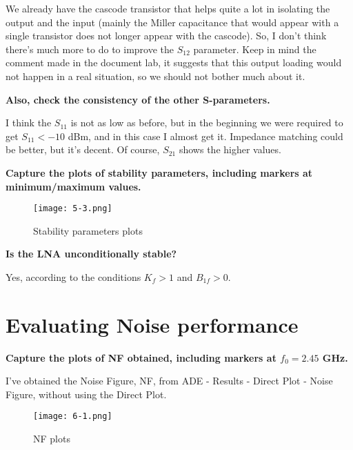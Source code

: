    \noindent We already have the cascode transistor that helps quite a lot in isolating the output and the input (mainly the Miller capacitance that would appear with a single transistor does not longer appear with the cascode). So, I don't think there's much more to do to improve the $S_{12}$ parameter. Keep in mind the comment made in the document lab, it suggests that this output loading would not happen in a real situation, so we should not bother much about it.




\begin{pexbox}{}
   \noindent \textbf{Also, check the consistency of the other S-parameters.}
\end{pexbox}

   \noindent I think the $S_{11}$ is not as low as before, but in the beginning we were required to get $S_{11}<-10$ dBm, and in this case I almost get it. Impedance matching could be better, but it's decent. Of course, $S_{21}$ shows the higher values.



\begin{pexbox}{}
   \noindent \textbf{Capture the plots of stability parameters, including markers at minimum/maximum values.}
\end{pexbox}

\begin{figure} [H] \centering
   \texttt{[image: 5-3.png]}
   \caption{Stability parameters plots}
\end{figure}


\begin{pexbox}{}
   \noindent \textbf{Is the LNA unconditionally stable?}
\end{pexbox}

   \noindent Yes, according to the conditions $K_f>1$ and $B_{1f}>0$.
 


\section{Evaluating Noise performance}
\begin{pexbox}{}
   \noindent \textbf{Capture the plots of NF obtained, including markers at $f_0 = 2.45$ GHz.}
\end{pexbox}
   
   \noindent I've obtained the Noise Figure, NF, from ADE - Results - Direct Plot - Noise Figure, without using the Direct Plot.
\begin{figure} [H] \centering
   \texttt{[image: 6-1.png]}
   \caption{NF plots}
\end{figure}


